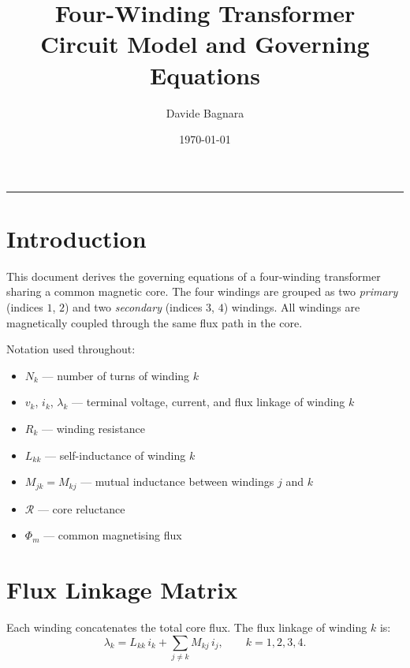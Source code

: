 \documentclass[11pt,a4paper]{article}
\newcommand{\Rel}{\mathcal{R}}          %
\begin{document}
\title{\textbf{Four-Winding Transformer}\\[4pt]
       \large Circuit Model and Governing Equations}
\author{Davide Bagnara}
\date{\today}
\maketitle
\tableofcontents
\vspace{6pt}
\hrule
\vspace{10pt}

\section{Introduction}

This document derives the governing equations of a four-winding transformer
sharing a common magnetic core.
The four windings are grouped as two \emph{primary} (indices $1$, $2$) and two
\emph{secondary} (indices $3$, $4$) windings.
All windings are magnetically coupled through the same flux path in the core.

Notation used throughout:
\begin{itemize}
  \item $N_k$ — number of turns of winding $k$
  \item $v_k$, $i_k$, $\lambda_k$ — terminal voltage, current, and flux linkage
        of winding $k$
  \item $R_k$ — winding resistance
  \item $L_{kk}$ — self-inductance of winding $k$
  \item $M_{jk} = M_{kj}$ — mutual inductance between windings $j$ and $k$
  \item $\Rel$ — core reluctance
  \item $\Phi_m$ — common magnetising flux
\end{itemize}

\section{Flux Linkage Matrix}

Each winding concatenates the total core flux. The flux linkage of winding $k$
is:
\begin{equation}
  \lambda_k = L_{kk}\,i_k + \sum_{j \neq k} M_{kj}\,i_j,
  \qquad k = 1,2,3,4.
  \label{eq:flux_scalar}
\end{equation}
\end{document}
